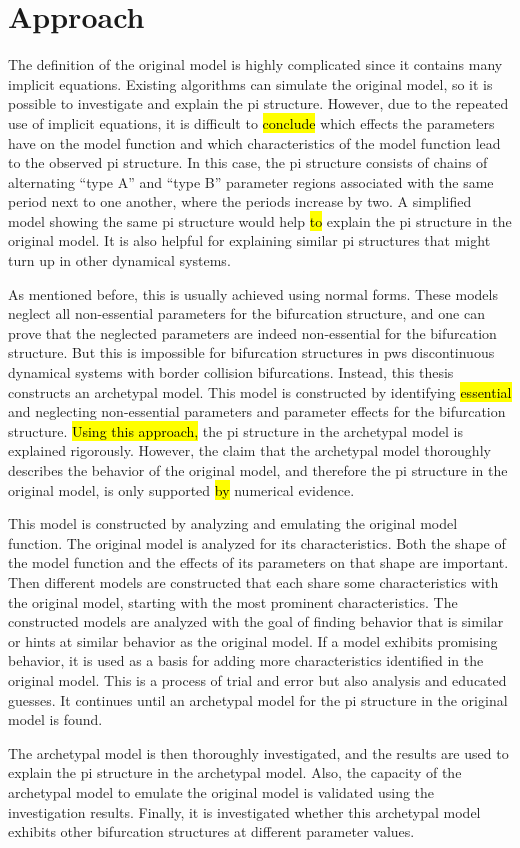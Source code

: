 \chapter{Approach}
\label{chap:approach}

The definition of the original model is highly complicated since it contains many implicit equations.
Existing algorithms can simulate the original model, so it is possible to investigate and explain the \gls{pi} structure.
However, due to the repeated use of implicit equations, it is difficult to \hl{conclude} which effects the parameters have on the model function and which characteristics of the model function lead to the observed \gls{pi} structure.
In this case, the \gls{pi} structure consists of chains of alternating ``type A'' and ``type B'' parameter regions associated with the same period next to one another, where the periods increase by two.
A simplified model showing the same \gls{pi} structure would help \hl{to} explain the \gls{pi} structure in the original model.
It is also helpful for explaining similar \gls{pi} structures that might turn up in other dynamical systems.

As mentioned before, this is usually achieved using normal forms.
These models neglect all non-essential parameters for the bifurcation structure, and one can prove that the neglected parameters are indeed non-essential for the bifurcation structure.
But this is impossible for bifurcation structures in \gls{pws} discontinuous dynamical systems with border collision bifurcations.
Instead, this thesis constructs an archetypal model.
This model is constructed by identifying \hl{essential} and neglecting non-essential parameters and parameter effects for the bifurcation structure.
\hl{Using this approach,}  the \gls{pi} structure in the archetypal model is explained rigorously.
However, the claim that the archetypal model thoroughly describes the behavior of the original model, and therefore the \gls{pi} structure in the original model, is only supported \hl{by} numerical evidence.

This model is constructed by analyzing and emulating the original model function.
The original model is analyzed for its characteristics.
Both the shape of the model function and the effects of its parameters on that shape are important.
Then different models are constructed that each share some characteristics with the original model, starting with the most prominent characteristics.
The constructed models are analyzed with the goal of finding behavior that is similar or hints at similar behavior as the original model.
If a model exhibits promising behavior, it is used as a basis for adding more characteristics identified in the original model.
This is a process of trial and error but also analysis and educated guesses.
It continues until an archetypal model for the \gls{pi} structure in the original model is found.


The archetypal model is then thoroughly investigated, and the results are used to explain the \gls{pi} structure in the archetypal model.
Also, the capacity of the archetypal model to emulate the original model is validated using the investigation results.
Finally, it is investigated whether this archetypal model exhibits other bifurcation structures at different parameter values.
